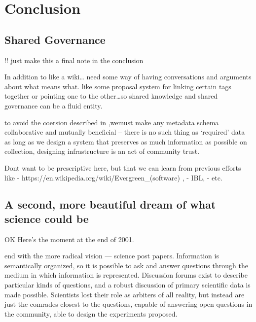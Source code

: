 \documentclass[nohyper]{tufte-book-jls}
\begin{document}
\hypertarget{conclusion}{%
\section{Conclusion}\label{conclusion}}

\hypertarget{shared-governance}{%
\subsection{Shared Governance}\label{shared-governance}}

!! just make this a final note in the conclusion

In addition to like a wiki\ldots{} need some way of having conversations
and arguments about what means what. like some proposal system for
linking certain tags together or pointing one to the other\ldots so
shared knowledge and shared governance can be a fluid entity.

to avoid the coersion described in \cite{bietzCollaborationMetagenomicsSequence2009},wemust make any
metadata schema collaborative and mutually beneficial -- there is no
such thing as `required' data as long as we design a system that
preserves as much information as possible on collection, designing
infrastructure is an act of community trust.

Dont want to be prescriptive here, but that we can learn from previous
efforts like - https://en.wikipedia.org/wiki/Evergreen\_(software) , -
IBL, - etc.

\hypertarget{a-second-more-beautiful-dream-of-what-science-could-be}{%
\subsection{A second, more beautiful dream of what science could
be}\label{a-second-more-beautiful-dream-of-what-science-could-be}}

OK Here's the moment at the end of 2001.

end with the more radical vision --- science post papers. Information is
semantically organized, so it is possible to ask and answer questions
through the medium in which information is represented. Discussion
forums exist to describe particular kinds of questions, and a robust
discussion of primary scientific data is made possible. Scientists lost
their role as arbiters of all reality, but instead are just the comrades
closest to the questions, capable of answering open questions in the
community, able to design the experiments proposed.
\end{document}
